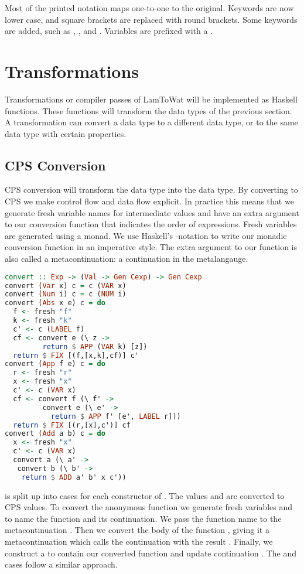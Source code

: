 {Most of the printed notation maps one-to-one to the original. Keywords are now lower case, and square brackets are replaced with round brackets. Some keywords are added, such as , , and . Variables are prefixed with a \icode{$}. 

\section{\label{section:transforms}Transformations}
Transformations or compiler passes of LamToWat will be implemented as Haskell functions. These functions will transform the data types of the previous section. A transformation can convert a data type to a different data type, or to the same data type with certain properties.

\subsection{\label{subsection:cpsconvert}CPS Conversion}
\ac{CPS} conversion will transform the  data type into the  data type. By converting to \ac{CPS} we make control flow and data flow explicit. In practice this means that we generate fresh variable names for intermediate values and have an extra argument to our conversion function that indicates the order of expressions. Fresh variables are generated using a monad. We use Haskell's -notation to write our monadic conversion function in an imperative style. The extra argument to our function is also called a metacontinuation: a continuation in the metalangauge.

\begin{lstlisting}[language=Haskell]
convert :: Exp -> (Val -> Gen Cexp) -> Gen Cexp
convert (Var x) c = c (VAR x)
convert (Num i) c = c (NUM i)
convert (Abs x e) c = do
  f <- fresh "f"
  k <- fresh "k"
  c' <- c (LABEL f)
  cf <- convert e (\ z ->
         return $ APP (VAR k) [z])
  return $ FIX [(f,[x,k],cf)] c'
convert (App f e) c = do
  r <- fresh "r"
  x <- fresh "x"
  c' <- c (VAR x)
  cf <- convert f (\ f' ->
         convert e (\ e' ->
           return $ APP f' [e', LABEL r]))
  return $ FIX [(r,[x],c')] cf
convert (Add a b) c = do
  x <- fresh "x"
  c' <- c (VAR x)
  convert a (\ a' ->
   convert b (\ b' ->
    return $ ADD a' b' x c'))
\end{lstlisting}

 is split up into cases for each constructor of . The values  and  are converted to \ac{CPS} values. To convert the anonymous function  we generate fresh variables  and  to name the function and its continuation. We pass the function name to the metacontinuation . Then we convert the body of the function , giving it a metacontinuation which calls the continuation with the result . Finally, we construct a  to contain our converted function and update continuation . The  and  cases follow a similar approach.

}
